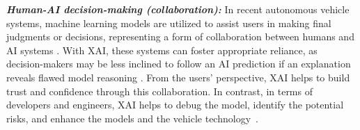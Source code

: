 \documentclass[final,5p,times,twocolumn]{elsarticle}
\begin{document}
\textbf{ \textit{Human-AI decision-making (collaboration):}} In recent autonomous vehicle systems, machine learning models are utilized to assist users in making final judgments or decisions, representing a form of collaboration between humans and AI systems \cite{chen2023understanding}. With XAI, these systems can foster appropriate reliance, as decision-makers may be less inclined to follow an AI prediction if an explanation reveals flawed model reasoning \cite{bussone2015role}. From the users' perspective, XAI helps to build trust and confidence through this collaboration. In contrast, in terms of developers and engineers, XAI helps to debug the model, identify the potential risks, and enhance the models and the vehicle technology~\cite{dong2023did}.

\end{document}
